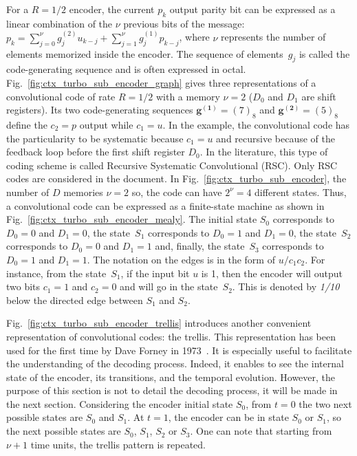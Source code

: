 For a $R=1/2$ encoder, the current $p_k$ output parity bit can be expressed as a
linear combination of the $\nu$ previous bits of the message:
$p_k = \sum_{j=0}^\nu g^{(2)}_{j} u_{k-j} + \sum_{j=1}^\nu g^{(1)}_{j} p_{k-j}$,
where $\nu$ represents the number of elements memorized inside the encoder.
The sequence of elements~$g_j$ is called the code-generating sequence and is
often expressed in octal. Fig.~\ref{fig:ctx_turbo_sub_encoder_graph} gives three
representations of a convolutional code of rate $R = 1/2$ with a memory
$\nu = 2$ ($D_0$ and $D_1$ are shift registers). Its two code-generating
sequences $\bm{g^{(1)}} = (7)_8$ and $\bm{g^{(2)}} = (5)_8$ define the $c_2 = p$
output while $c_1 = u$. In the example, the convolutional code has the
particularity to be systematic because $c_1 = u$ and recursive because of the
feedback loop before the first shift register $D_0$. In the literature, this
type of coding scheme is called Recursive Systematic Convolutional (RSC). Only
RSC codes are considered in the document. In
Fig.~\ref{fig:ctx_turbo_sub_encoder}, the number of $D$ memories $\nu = 2$ so,
the code can have $2^\nu = 4$ different states. Thus, a convolutional code can
be expressed as a finite-state machine as shown in
Fig.~\ref{fig:ctx_turbo_sub_encoder_mealy}. The initial state $S_0$ corresponds
to $D_0 = 0$ and $D_1 = 0$, the state~$S_1$ corresponds to $D_0 = 1$ and
$D_1 = 0$, the state~$S_2$ corresponds to $D_0 = 0$ and $D_1 = 1$ and, finally,
the state~$S_3$ corresponds to $D_0 = 1$ and $D_1 = 1$. The notation on the
edges is in the form of $u/c_1c_2$. For instance, from the state~$S_1$, if the
input bit $u$ is 1, then the encoder will output two bits $c_1 = 1$ and
$c_2 = 0$ and will go in the state~$S_2$. This is denoted by \emph{1/10} below
the directed edge between $S_1$ and $S_2$.

Fig.~\ref{fig:ctx_turbo_sub_encoder_trellis} introduces another convenient
representation of convolutional codes: the trellis. This representation has
been used for the first time by Dave Forney in 1973~\cite{Forney1973}. It is
especially useful to facilitate the understanding of the decoding process.
Indeed, it enables to see the internal state of the encoder, its transitions,
and the temporal evolution. However, the purpose of this section is not to
detail the decoding process, it will be made in the next section. Considering
the encoder initial state $S_0$, from $t = 0$ the two next possible states are
$S_0$ and $S_1$. At $t = 1$, the encoder can be in state $S_0$ or $S_1$, so the
next possible states are $S_0$, $S_1$, $S_2$ or $S_3$. One can note that
starting from $\nu +1$ time units, the trellis pattern is repeated.

